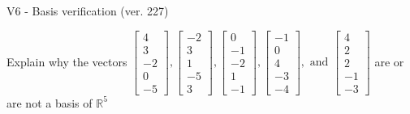 \begin{exercise}
  \begin{exerciseTitle}V6 - Basis verification (ver. 227)\end{exerciseTitle}
  \begin{exerciseStatement}
    Explain why the vectors \(\left[\begin{array}{r}
4 \\
3 \\
-2 \\
0 \\
-5
\end{array}\right] , \left[\begin{array}{r}
-2 \\
3 \\
1 \\
-5 \\
3
\end{array}\right] , \left[\begin{array}{r}
0 \\
-1 \\
-2 \\
1 \\
-1
\end{array}\right] , \left[\begin{array}{r}
-1 \\
0 \\
4 \\
-3 \\
-4
\end{array}\right] , \text{ and } \left[\begin{array}{r}
4 \\
2 \\
2 \\
-1 \\
-3
\end{array}\right]\) are or are not a basis of \(\mathbb{R}^5\)	



\end{exerciseStatement}
\end{exercise}
